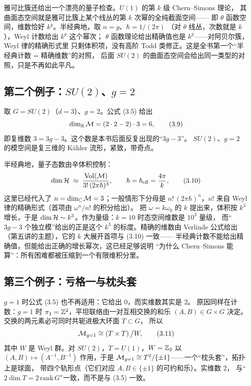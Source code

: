 雅可比簇还给出一个漂亮的量子检查。$U(1)$ 的第 $k$ 级 Chern--Simons 理论，
其曲面态空间就是雅可比簇上某个线丛的第 $k$ 次幂的全纯截面空间——
即 $\theta$ 函数空间，维数恰好 $k^g$。半经典地，取 $n=g$、$\hbar=1/(2\pi)$
（对 $\theta$ 线丛，次数就是 $k$），Weyl 计数给出 $k^{g}$ 这个幂次；
$\theta$ 函数理论给出精确值也是 $k^g$——对阿贝尔簇，Weyl 律的精确形式里
只剩体积项，没有高阶 Todd 类修正。这是全书第一个“半经典计数 = 精确维数”的对照，
后面 $SU(2)$ 的曲面态空间会给出同一类型的对照，只是不再如此平凡。

\subsection{第二个例子：$SU(2)$、$g=2$}

取 $G=SU(2)$（$d=3$）、$g=2$。公式 (3.5) 给出
\begin{equation}
\dim_{\mathbb{R}}\mathcal{M}=(2\cdot2-2)\cdot3=6, \tag{3.9}
\end{equation}
即复维数 $3=3g-3$。这个数是本书后面反复出现的“$3g-3$”。
$SU(2)$、$g=2$ 的模空间是复三维的 Kähler 流形，紧致，带奇点。

半经典地，量子态数由辛体积控制：
\begin{equation}
\dim\mathcal{H}\;\approx\;\frac{\mathrm{Vol}(\mathcal{M})}{3!\,(2\pi\hbar)^{3}},\qquad \hbar=\hbar_{\text{eff}}=\frac{4\pi}{k}, \tag{3.10}
\end{equation}
这里已经代入了 $n=\dim_{\mathbb{C}}\mathcal{M}=3$；一般情形下分母是 $n!\,(2\pi\hbar)^{n}$，$n!$ 来自 Weyl 律的精确形式（首项由 $\omega^n/n!$ 的积分给出）。
把 $\omega=k\omega_0$ 的 $k$ 提出来，体积按 $k^{3}$ 增长，于是
$\dim\mathcal{H}\sim k^{3}$。作为量级：$k=10$ 时态空间维数是 $10^{3}$ 量级，
而“$3g-3$ 个独立模”给出的正是这个 $k^{3}$ 的标度。精确的维数由
Verlinde 公式给出（第五讲的主题），它的 $k$ 大展开首项与 (3.10) 一致——
半经典计数不能给出精确值，但能给出正确的增长幂次，这已经足够说明
“为什么 Chern--Simons 能算”：所有困难都被压缩到一个有限维积分里。

\subsection{第三个例子：亏格一与枕头套}

$g=1$ 时公式 (3.5) 也不再适用：它给出 $0$，而实维数其实是 $2$。
原因同样在计数：$g=1$ 时 $\pi_1=\mathbb{Z}^2$，平坦联络由一对互相交换的和乐
$(A,B)\in G\times G$ 决定。交换的两元素必可同时共轭进极大环面 $T\subset G$，
所以
\begin{equation}
\mathcal{M}_{g=1}\cong\left(T\times T\right)\big/ W, \tag{3.11}
\end{equation}
其中 $W$ 是 Weyl 群。对 $SU(2)$，$T=U(1)$，$W=\mathbb{Z}_2$ 以 $(A,B)\mapsto(A^{-1},B^{-1})$
作用，于是 $\mathcal{M}_{g=1}\cong T^2/\{\pm1\}$——一个“枕头套”，拓扑上是球面，
带四个轨形点（它们对应 $A,B\in\{\pm1\}$ 的可约和乐）。实维数 $2$，
与“$2\dim T=2\,\mathrm{rank}\,G$”一致，而不是与 (3.5) 一致。

